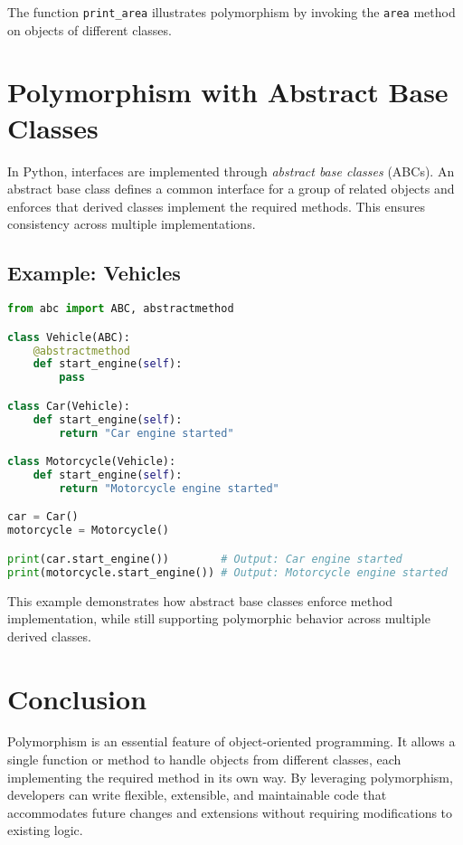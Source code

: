 The function \texttt{print\_area} illustrates polymorphism by invoking the \texttt{area} method on objects of different classes.

\section{Polymorphism with Abstract Base Classes}

In Python, interfaces are implemented through \textit{abstract base classes} (ABCs). An abstract base class defines a common interface for a group of related objects and enforces that derived classes implement the required methods. This ensures consistency across multiple implementations.

\subsection{Example: Vehicles}

\begin{lstlisting}[language=Python, caption=Polymorphism using Abstract Base Classes]
from abc import ABC, abstractmethod

class Vehicle(ABC):
    @abstractmethod
    def start_engine(self):
        pass

class Car(Vehicle):
    def start_engine(self):
        return "Car engine started"

class Motorcycle(Vehicle):
    def start_engine(self):
        return "Motorcycle engine started"

car = Car()
motorcycle = Motorcycle()

print(car.start_engine())        # Output: Car engine started
print(motorcycle.start_engine()) # Output: Motorcycle engine started
\end{lstlisting}

This example demonstrates how abstract base classes enforce method implementation, while still supporting polymorphic behavior across multiple derived classes.

\section{Conclusion}

Polymorphism is an essential feature of object-oriented programming. It allows a single function or method to handle objects from different classes, each implementing the required method in its own way. By leveraging polymorphism, developers can write flexible, extensible, and maintainable code that accommodates future changes and extensions without requiring modifications to existing logic.

